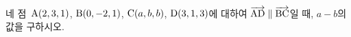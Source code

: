 네 점~$\mathrm{A}(2{,}\mkern3mu\mathopen{}3{,}\mkern3mu\mathopen{}1)$, $\mathrm{B}(0{,}\mkern3mu\mathopen{}-2{,}\mkern3mu\mathopen{}1)$, $\mathrm{C}(a{,}\mkern3mu\mathopen{}b{,}\mkern3mu\mathopen{}b)$, $\mathrm{D}(3{,}\mkern3mu\mathopen{}1{,}\mkern3mu\mathopen{}3)$에 대하여 $\overrightarrow{\mathrm{AD}}\parallel\overrightarrow{\mathrm{BC}}$일 때, $a-b$의 값을 구하시오.
